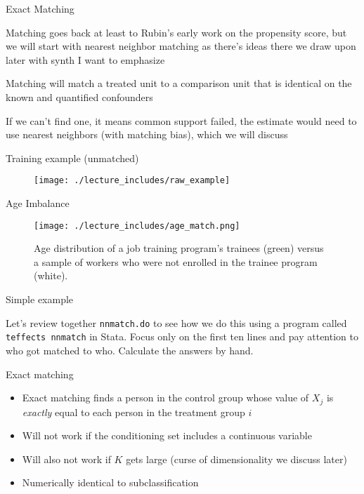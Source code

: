 \documentclass{beamer}
\begin{document}
\begin{frame}{Exact Matching}


Matching goes back at least to Rubin's early work on the propensity score, but we will start with nearest neighbor matching as there's ideas there we draw upon later with synth I want to emphasize

\bigskip

Matching will match a treated unit to a comparison unit that is identical on the known and quantified confounders

\bigskip

If we can't find one, it means common support failed, the estimate would need to use nearest neighbors (with matching bias), which we will discuss



\end{frame}



\begin{frame}{Training example (unmatched)}

\begin{figure}[!t]\centering
\texttt{[image: ./lecture\_includes/raw\_example]}
\end{figure}


\end{frame}


\begin{frame}{Age Imbalance}

\begin{figure}[!t]\centering
\caption{Age distribution of a job training program's trainees (green) versus a sample of workers who were not enrolled in the trainee program (white).}
\texttt{[image: ./lecture\_includes/age\_match.png]}
\end{figure}

\end{frame}

\begin{frame}{Simple example}

Let's review together \texttt{nnmatch.do} to see how we do this using a program called \texttt{teffects nnmatch} in Stata. Focus only on the first ten lines and pay attention to who got matched to who.  Calculate the answers by hand. 


\end{frame}


\begin{frame}{Exact matching}

\begin{itemize}
\item Exact matching finds a person in the control group whose value of $X_j$ is \emph{exactly} equal to each person in the treatment group $i$
\item Will not work if the conditioning set includes a continuous variable
\item Will also not work if $K$ gets large (curse of dimensionality we discuss later)
\item Numerically identical to subclassification
\end{itemize}

\end{frame}
\end{document}
